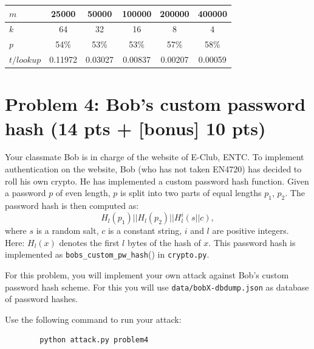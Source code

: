 \documentclass[11pt,letterpaper]{article}
\newenvironment{answer}{\em \color{blue} \begin{adjustwidth}{1cm}{1cm}}{\end{adjustwidth}}
\begin{document}
\begin{enumerate}
\begin{answer}
			\begin{center}
				\begin{tabular}{l|c|c|c|c|c|}
					\hline
					$m$ & 25000 & 50000 & 100000 & 200000 & 400000 \\ \hline
					$k$ & 64 & 32    & 16      & 8      & 4      \\ \hline \hline
					$p$ & 54\% & 53\%  &  53\%  & 57\%  &  58\%   \\ \hline
					$t/lookup$ &  0.11972 & 0.03027 &0.00837 & 0.00207& 0.00059\\ \hline
				\end{tabular}	
			\end{center}
			
		\end{answer}
		
	\end{enumerate}
	
	\newpage
	
	\section*{Problem 4: Bob's custom password hash (14 pts + [bonus] 10 pts)}
	
	Your classmate Bob is in charge of the website of E-Club, ENTC. To implement authentication on the website, Bob (who has not taken EN4720) has decided to roll his own crypto. He has implemented a custom password hash function. Given a password $p$ of even length, $p$ is split into two parts of equal lengths $p_1$, $p_2$. The password hash is then computed as:
	\[ H_l(p_1) || H_l(p_2) || H_l^i(s || c) , \]
	where $s$ is a random salt, $c$ is a constant string, $i$ and $l$ are positive integers. Here: $H_l(x)$ denotes the first $l$ bytes of the hash of $x$. This password hash is implemented as \texttt{bobs\_custom\_pw\_hash}() in \texttt{crypto.py}.
	
	
	For this problem, you will implement your own attack against Bob's custom password hash scheme. For this you will use \texttt{data/bobX-dbdump.json} as database of password hashes.
	
	Use the following command to run your attack:
	\begin{Verbatim}
		python attack.py problem4
	\end{Verbatim}
	
\end{document}
